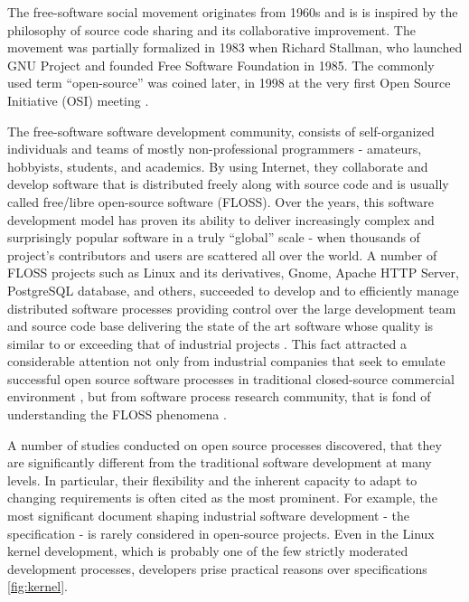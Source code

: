The free-software social movement originates from 1960s and is is inspired by the philosophy of 
source code sharing and its collaborative improvement. The movement was partially formalized in 1983 
when Richard Stallman, who launched GNU Project and founded Free Software Foundation in 1985.
The commonly used term ``open-source'' was coined later, in 1998 at the very first Open Source 
Initiative (OSI) meeting \cite{osi-history}.

The free-software software development community, consists of self-organized individuals and teams of 
mostly non-professional programmers - amateurs, hobbyists, students, and academics. 
By using Internet, they collaborate and develop software that is distributed freely along with source 
code and is usually called free/libre open-source software (FLOSS). 
Over the years, this software development model has proven its ability to deliver increasingly complex 
and surprisingly popular software in a truly ``global'' scale - when thousands of project's contributors 
and users are scattered all over the world. A number of FLOSS projects such as Linux and its 
derivatives, Gnome, Apache HTTP Server, PostgreSQL database, and others, succeeded to develop and to 
efficiently manage distributed software processes providing control over the large development 
team and source code base delivering the state of the art software whose quality is similar to
or exceeding that of industrial projects \cite{coverity2012}. 
This fact attracted a considerable attention not only from industrial companies that seek to emulate 
successful open source software processes in traditional closed-source commercial environment 
\cite{oss_virtual_organizations} \cite{oss_balance} \cite{oss_hp} \cite{oss_4industry}, 
but from software process research community, that is fond of understanding the FLOSS phenomena
\cite{citeulike:12550640} \cite{citeulike:5043664} \cite{citeulike:5128808} \cite{citeulike:10377366}.


A number of studies conducted on open source processes discovered, that they are significantly 
different from the traditional software development at many levels. 
In particular, their flexibility and the inherent capacity to adapt to changing requirements is often cited as 
the most prominent. 
For example, the most significant document shaping industrial software development - the specification - is rarely 
considered in open-source projects. Even in the Linux kernel development, which is probably one of the few strictly 
moderated development processes, developers prise practical reasons over specifications \ref{fig:kernel}.

